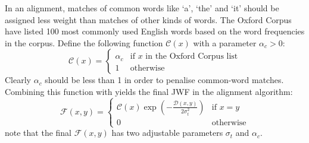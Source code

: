 In an alignment, matches of common words like `a', `the' and `it' should be assigned less weight than matches of other kinds of words. The Oxford Corpus have listed 100 most commonly used English words \cite{oec-common-words} based on the word frequencies in the corpus. Define the following function $\mathcal{C}(x)$ with a parameter $\alpha_c > 0$:
\begin{equation}
  \mathcal{C}(x) = 
  \begin{cases}
    \alpha_c & \text{if } x \text{ in the Oxford Corpus list}\\
    1 & \text{otherwise}
  \end{cases}
\end{equation}
Clearly $\alpha_c$ should be less than 1 in order to penalise common-word matches. Combining this function with  yields the final JWF in the alignment algorithm:
\begin{equation}
  \mathcal{F}(x,y) = 
  \begin{cases}
    \mathcal{C}(x) \exp \left(-\frac{\mathcal{D}(x,y)}{2 \sigma_t^2}\right) & \text{if } x = y\\
    0 & \text{otherwise}
  \end{cases}
  \label{eq:jwf-final}
\end{equation}
note that the final $\mathcal{F}(x,y)$ has two adjustable parameters $\sigma_t$ and $\alpha_c$.


